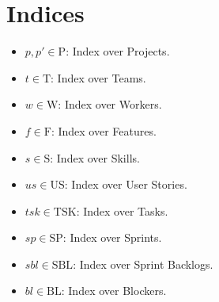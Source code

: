 \documentclass[11pt]{article}
\begin{document}
\section{Indices}
\begin{itemize}[label=--]
    \item $p, p' \in \text{P}$: Index over Projects.
    \item $t \in \text{T}$: Index over Teams.
    \item $w \in \text{W}$: Index over Workers.
    \item $f \in \text{F}$: Index over Features.
    \item $s \in \text{S}$: Index over Skills.
    \item $us \in \text{US}$: Index over User Stories.
    \item $tsk \in \text{TSK}$: Index over Tasks.
    \item $sp \in \text{SP}$: Index over Sprints.
    \item $sbl \in \text{SBL}$: Index over Sprint Backlogs.
    \item $bl \in \text{BL}$: Index over Blockers.
\end{itemize}
\end{document}
